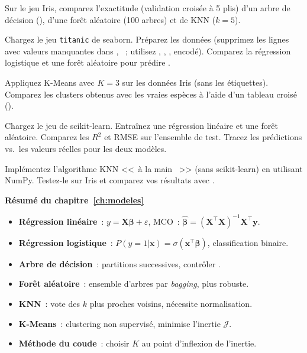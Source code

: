 \begin{exercice}[$\star$]
Sur le jeu Iris, comparez l'exactitude (validation crois\'ee \`a 5 plis) d'un arbre de d\'ecision (), d'une for\^et al\'eatoire (100 arbres) et de KNN ($k=5$).
\end{exercice}

\begin{exercice}[$\star\star$]
Chargez le jeu \texttt{titanic} de seaborn. Pr\'eparez les donn\'ees (supprimez les lignes avec valeurs manquantes dans , ~; utilisez , , ,  encod\'e). Comparez la r\'egression logistique et une for\^et al\'eatoire pour pr\'edire .
\end{exercice}

\begin{exercice}[$\star\star$]
Appliquez K-Means avec $K=3$ sur les donn\'ees Iris (sans les \'etiquettes). Comparez les clusters obtenus avec les vraies esp\`eces \`a l'aide d'un tableau crois\'e ().
\end{exercice}

\begin{exercice}[$\star\star\star$]
Chargez le jeu  de scikit-learn. Entra\^inez une r\'egression lin\'eaire et une for\^et al\'eatoire. Comparez les $R^2$ et RMSE sur l'ensemble de test. Tracez les pr\'edictions vs.\ les valeurs r\'eelles pour les deux mod\`eles.
\end{exercice}

\begin{exercice}[$\star\star\star$]
Impl\'ementez l'algorithme KNN <<~\`a la main ~>> (sans scikit-learn) en utilisant NumPy. Testez-le sur Iris et comparez vos r\'esultats avec .
\end{exercice}

\begin{formules}
\textbf{R\'esum\'e du chapitre~\ref{ch:modeles}}
\begin{itemize}
    \item \textbf{R\'egression lin\'eaire}~: $y = \mathbf{X}\boldsymbol{\beta} + \varepsilon$, MCO~: $\hat{\boldsymbol{\beta}} = (\mathbf{X}^\top\mathbf{X})^{-1}\mathbf{X}^\top\mathbf{y}$.
    \item \textbf{R\'egression logistique}~: $P(y{=}1|\mathbf{x}) = \sigma(\mathbf{x}^\top\boldsymbol{\beta})$, classification binaire.
    \item \textbf{Arbre de d\'ecision}~: partitions successives, contr\^oler .
    \item \textbf{For\^et al\'eatoire}~: ensemble d'arbres par \textit{bagging}, plus robuste.
    \item \textbf{KNN}~: vote des $k$ plus proches voisins, n\'ecessite normalisation.
    \item \textbf{K-Means}~: clustering non supervis\'e, minimise l'inertie $\mathcal{J}$.
    \item \textbf{M\'ethode du coude}~: choisir $K$ au point d'inflexion de l'inertie.
\end{itemize}
\end{formules}
